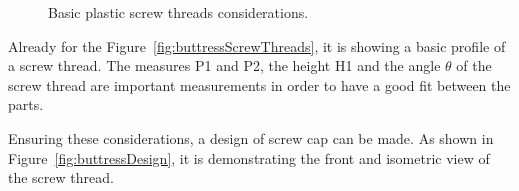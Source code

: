 \begin{figure}[h!]
    \centering
    \quad\quad
    \caption{Basic plastic screw threads considerations.}
    \label{fig:threads}
\end{figure}

Already for the Figure~\ref{fig:buttressScrewThreads}, it is showing a basic profile of a screw thread. The measures P1 and P2, the height H1 and the angle \begin{math}\theta\end{math} of the screw thread are important measurements in order to have a good fit between the parts.

Ensuring these considerations, a design of screw cap can be made. As shown in Figure~\ref{fig:buttressDesign}, it is demonstrating the front and isometric view of the screw thread.

